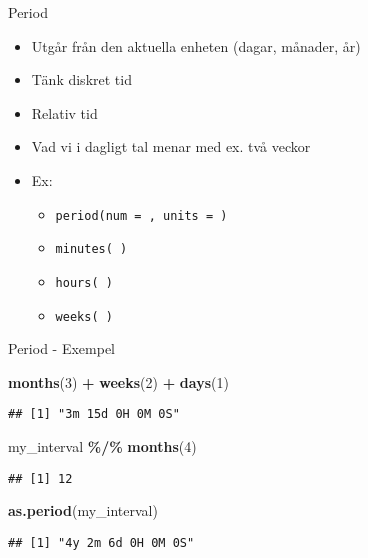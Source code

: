 \documentclass[
  11pt,
  ignorenonframetext,
  handout]{beamer}
\newenvironment{Shaded}{\begin{snugshade}}{\end{snugshade}}
\newcommand{\DecValTok}[1]{\textcolor[rgb]{0.00,0.00,0.81}{#1}}
\newcommand{\FunctionTok}[1]{\textcolor[rgb]{0.13,0.29,0.53}{\textbf{#1}}}
\newcommand{\NormalTok}[1]{#1}
\newcommand{\SpecialCharTok}[1]{\textcolor[rgb]{0.81,0.36,0.00}{\textbf{#1}}}
\providecommand{\tightlist}{%
  \setlength{\itemsep}{0pt}\setlength{\parskip}{0pt}}
\begin{document}
\begin{frame}{Period}
\label{period}
\begin{itemize}
\tightlist
\item
  Utgår från den aktuella enheten (dagar, månader, år)
\item
  Tänk diskret tid
\item
  Relativ tid
\item
  Vad vi i dagligt tal menar med ex. två veckor
\item
  Ex:

  \begin{itemize}
  \tightlist
  \item
    \texttt{period(num = , units = )}
  \item
    \texttt{minutes( )}
  \item
    \texttt{hours( )}
  \item
    \texttt{weeks( )}
  \end{itemize}
\end{itemize}
\end{frame}

\begin{frame}[fragile]{Period - Exempel}
\label{period---exempel}
\begin{Shaded}
\begin{Highlighting}[]
\FunctionTok{months}\NormalTok{(}\DecValTok{3}\NormalTok{) }\SpecialCharTok{+} \FunctionTok{weeks}\NormalTok{(}\DecValTok{2}\NormalTok{) }\SpecialCharTok{+} \FunctionTok{days}\NormalTok{(}\DecValTok{1}\NormalTok{)}
\end{Highlighting}
\end{Shaded}

\begin{verbatim}
## [1] "3m 15d 0H 0M 0S"
\end{verbatim}

\begin{Shaded}
\begin{Highlighting}[]
\NormalTok{my\_interval }\SpecialCharTok{\%/\%} \FunctionTok{months}\NormalTok{(}\DecValTok{4}\NormalTok{)}
\end{Highlighting}
\end{Shaded}

\begin{verbatim}
## [1] 12
\end{verbatim}

\begin{Shaded}
\begin{Highlighting}[]
\FunctionTok{as.period}\NormalTok{(my\_interval)}
\end{Highlighting}
\end{Shaded}

\begin{verbatim}
## [1] "4y 2m 6d 0H 0M 0S"
\end{verbatim}
\end{frame}
\end{document}

